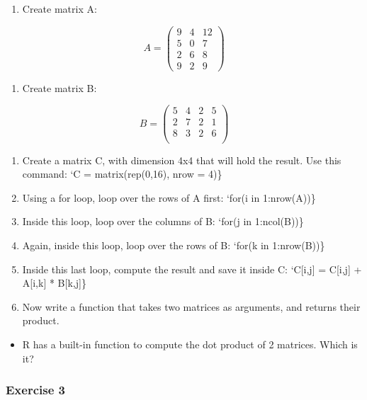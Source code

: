 \documentclass[
]{article}
\providecommand{\tightlist}{%
  \setlength{\itemsep}{0pt}\setlength{\parskip}{0pt}}
\begin{document}
\begin{enumerate}
\def\labelenumi{\arabic{enumi})}
\tightlist
\item
  Create matrix A:
\end{enumerate}

\[A = \left(
  \begin{array}{ccc}
   9 & 4 & 12 \\
   5 & 0 & 7 \\
   2 & 6 & 8 \\
   9 & 2 & 9
  \end{array} \right)
\]

\begin{enumerate}
\def\labelenumi{\arabic{enumi})}
\setcounter{enumi}{1}
\tightlist
\item
  Create matrix B:
\end{enumerate}

\[B = \left(
\begin{array}{cccc}
 5 & 4 & 2 & 5 \\
 2 & 7 & 2 & 1 \\
 8 & 3 & 2 & 6 \\
\end{array} \right)
\]

\begin{enumerate}
\def\labelenumi{\arabic{enumi})}
\setcounter{enumi}{2}
\item
  Create a matrix C, with dimension 4x4 that will hold the result. Use this command: `C = matrix(rep(0,16), nrow = 4)\}
\item
  Using a for loop, loop over the rows of A first: `for(i in 1:nrow(A))\}
\item
  Inside this loop, loop over the columns of B: `for(j in 1:ncol(B))\}
\item
  Again, inside this loop, loop over the rows of B: `for(k in 1:nrow(B))\}
\item
  Inside this last loop, compute the result and save it inside C: `C{[}i,j{]} = C{[}i,j{]} + A{[}i,k{]} * B{[}k,j{]}\}
\item
  Now write a function that takes two matrices as arguments, and returns their product.
\end{enumerate}

\begin{itemize}
\tightlist
\item
  R has a built-in function to compute the dot product of 2 matrices. Which is it?
\end{itemize}

\hypertarget{exercise-3-3}{%
\subsubsection*{Exercise 3}\label{exercise-3-3}}
\end{document}
